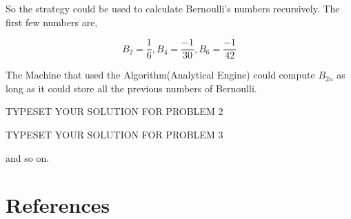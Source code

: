 \documentclass[fleqn,letterpaper,12pt]{report}
\begin{document}
So the strategy could be used to calculate Bernoulli's numbers recursively. The first few numbers are,

$$ B_2 = \frac{1}{6}, B_4 = \frac{-1}{30}, B_6 = \frac{-1}{42}$$

The Machine that used the Algorithm(Analytical Engine) could compute $B_{2n}$ as long as it could store all the previous numbers of Bernoulli.\cite{lll}
%
\newpage
{}
{}
\problem
TYPESET YOUR SOLUTION FOR PROBLEM 2

%
\newpage
{}
{}
\problem
TYPESET YOUR SOLUTION FOR PROBLEM 3

\vfill
and so on.

\newpage
{}
\section*{References}


\end{document}
